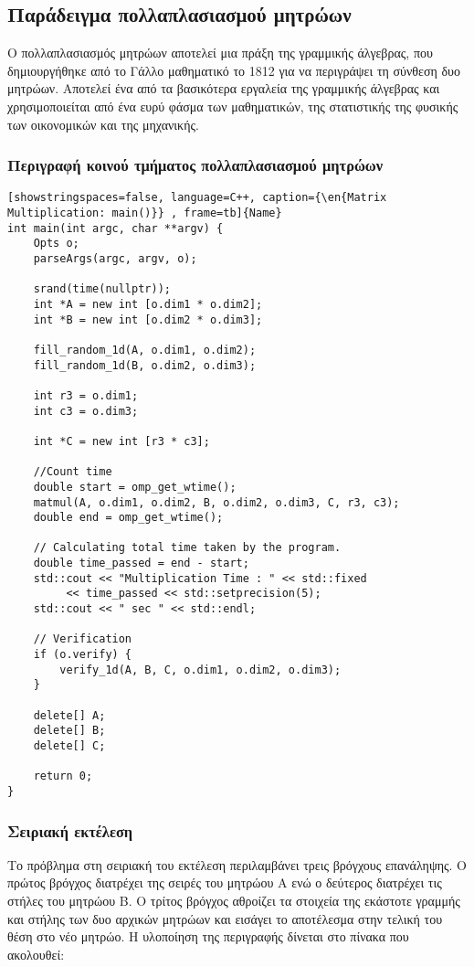 \clearpage
\subsection{Παράδειγμα πολλαπλασιασμού μητρώων}
Ο πολλαπλασιασμός μητρώων αποτελεί μια πράξη της γραμμικής άλγεβρας, που δημιουργήθηκε από το Γάλλο μαθηματικό  το 1812 για να περιγράψει τη σύνθεση δυο μητρώων. Αποτελεί ένα από τα βασικότερα εργαλεία της γραμμικής άλγεβρας και χρησιμοποιείται από ένα ευρύ φάσμα των μαθηματικών, της στατιστικής της φυσικής των οικονομικών και της μηχανικής.\cite{wiki_mat_mul}

\subsubsection{Περιγραφή κοινού τμήματος πολλαπλασιασμού μητρώων}
\begin{spacing}{0.7}
\begin{lstlisting}[showstringspaces=false, language=C++, caption={\en{Matrix Multiplication: main()}} , frame=tb]{Name}
int main(int argc, char **argv) {
    Opts o;
    parseArgs(argc, argv, o);

    srand(time(nullptr));
    int *A = new int [o.dim1 * o.dim2];
    int *B = new int [o.dim2 * o.dim3];

    fill_random_1d(A, o.dim1, o.dim2);
    fill_random_1d(B, o.dim2, o.dim3);

    int r3 = o.dim1;
    int c3 = o.dim3;

    int *C = new int [r3 * c3];

    //Count time
    double start = omp_get_wtime();
    matmul(A, o.dim1, o.dim2, B, o.dim2, o.dim3, C, r3, c3);
    double end = omp_get_wtime();

    // Calculating total time taken by the program.
    double time_passed = end - start;
    std::cout << "Multiplication Time : " << std::fixed
         << time_passed << std::setprecision(5);
    std::cout << " sec " << std::endl;

    // Verification
    if (o.verify) {
        verify_1d(A, B, C, o.dim1, o.dim2, o.dim3);
    }

    delete[] A;
    delete[] B;
    delete[] C;

    return 0;
}
\end{lstlisting}
\end{spacing}
\clearpage

\subsubsection{Σειριακή εκτέλεση}
Το πρόβλημα στη σειριακή του εκτέλεση περιλαμβάνει τρεις βρόγχους επανάληψης. Ο πρώτος βρόγχος διατρέχει της σειρές του μητρώου Α ενώ ο δεύτερος διατρέχει τις στήλες του μητρώου Β. Ο τρίτος βρόγχος αθροίζει τα στοιχεία της εκάστοτε γραμμής και στήλης των δυο αρχικών μητρώων και εισάγει το αποτέλεσμα στην τελική του θέση στο νέο μητρώο. Η υλοποίηση της περιγραφής δίνεται στο πίνακα που ακολουθεί:

